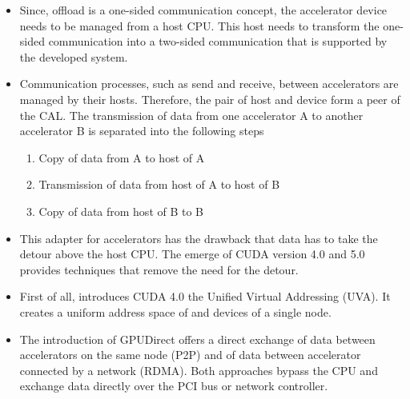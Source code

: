 \begin{itemize}
\item Since, offload is a one-sided communication concept, the
  accelerator device needs to be managed from a host CPU. This host
  needs to transform the one-sided communication into a two-sided
  communication that is supported by the developed system.

\item Communication processes, such as send and receive, between
  accelerators are managed by their hosts. Therefore, the pair of host
  and device form a peer of the CAL. The transmission of data from one
  accelerator A to another accelerator B is separated into the
  following steps

  \begin{enumerate}
  \item Copy of data from A to host of A
  \item Transmission of data from host of A to host of B
  \item Copy of data from host of B to B
  \end{enumerate}

\item This adapter for accelerators has the drawback that data has to
  take the detour above the host CPU. The emerge of CUDA version 4.0
  and 5.0 provides techniques that remove the need for the detour.

\item First of all, introduces CUDA 4.0 the Unified Virtual Addressing
  (UVA).  It creates a uniform address space of and devices of a
  single node.

\item The introduction of GPUDirect offers a direct exchange of data
  between accelerators on the same node (P2P) and of data between
  accelerator connected by a network (RDMA).  Both approaches bypass
  the CPU and exchange data directly over the PCI bus or network
  controller.



\end{itemize}


